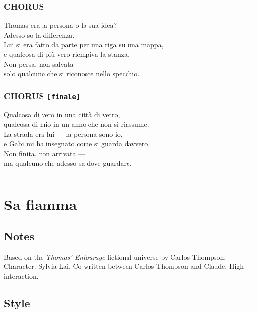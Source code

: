 \subsubsection{CHORUS}\label{chorus-39}

Thomas era la persona o la sua idea?\\
Adesso so la differenza.\\
Lui si era fatto da parte per una riga su una mappa,\\
e qualcosa di più vero riempiva la stanza.\\
Non persa, non salvata ---\\
solo qualcuno che si riconosce nello specchio.

\subsubsection{\texorpdfstring{CHORUS
\texttt{{[}finale{]}}}{CHORUS {[}finale{]}}}\label{chorus-finale}

Qualcosa di vero in una città di vetro,\\
qualcosa di mio in un anno che non si riassume.\\
La strada era lui --- la persona sono io,\\
e Gabi mi ha insegnato come si guarda davvero.\\
Non finita, non arrivata ---\\
ma qualcuno che adesso sa dove guardare.

\begin{center}\rule{0.5\linewidth}{0.5pt}\end{center}

\section{Sa fiamma}\label{sa-fiamma}

\subsection{Notes}\label{notes-17}

Based on the \emph{Thomas' Entourage} fictional universe by Carlos
Thompson. Character: Sylvia Lai. Co-written between Carlos Thompson and
Claude. High interaction.

\subsection{Style}\label{style-16}

